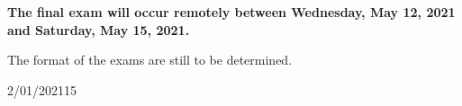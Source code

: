 \documentclass[11pt,reqno]{amsproc}
\newcommand{\MWClass}{%
\calday[Monday]{\classday} %
\skipday %
\calday[Wednesday]{\classday} %
\skipday %
\skipday %
\skipday\skipday %
}
\begin{document}
\newpage

\begin{center}


\textbf{The final exam will occur remotely between Wednesday, May 12, 2021 and Saturday, May 15, 2021.}

The format of the exams are still to be determined.

\begin{calendar}{2/01/2021}{15} %
\setlength\calboxdepth{.25in}
\setlength\calwidth{\textwidth}
\MWClass









\end{calendar}
\end{center}
\end{document}
